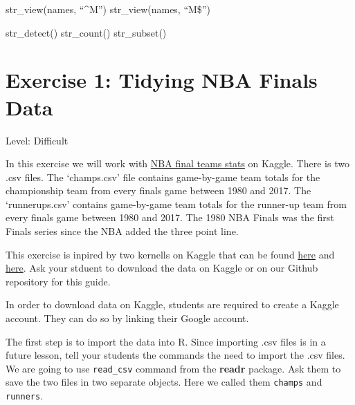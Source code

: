 \documentclass[]{book}
\newenvironment{Shaded}{\begin{snugshade}}{\end{snugshade}}
\newcommand{\CommentTok}[1]{\textcolor[rgb]{0.56,0.35,0.01}{\textit{#1}}}
\newcommand{\DataTypeTok}[1]{\textcolor[rgb]{0.13,0.29,0.53}{#1}}
\newcommand{\KeywordTok}[1]{\textcolor[rgb]{0.13,0.29,0.53}{\textbf{#1}}}
\newcommand{\NormalTok}[1]{#1}
\newcommand{\OperatorTok}[1]{\textcolor[rgb]{0.81,0.36,0.00}{\textbf{#1}}}
\newcommand{\OtherTok}[1]{\textcolor[rgb]{0.56,0.35,0.01}{#1}}
\newcommand{\StringTok}[1]{\textcolor[rgb]{0.31,0.60,0.02}{#1}}
\begin{document}
str\_view(names, ``\^{}M'')
str\_view(names, ``M\$'')

str\_detect()
str\_count()
str\_subset()

\hypertarget{exercise-1-tidying-nba-finals-data}{%
\section*{Exercise 1: Tidying NBA Finals Data}\label{exercise-1-tidying-nba-finals-data}}

Level: Difficult

In this exercise we will work with \href{https://www.kaggle.com/daverosenman/nba-finals-team-stats}{NBA final teams stats} on Kaggle. There is two .csv files. The `champs.csv' file contains game-by-game team totals for the championship team from every finals game between 1980 and 2017. The `runnerups.csv' contains game-by-game team totals for the runner-up team from every finals game between 1980 and 2017. The 1980 NBA Finals was the first Finals series since the NBA added the three point line.

This exercise is inpired by two kernells on Kaggle that can be found \href{https://www.kaggle.com/carterallen/nba-championship-data}{here} and \href{https://www.kaggle.com/daverosenman/nba-finals-three-point-stats-1980-2017}{here}. Ask your stduent to download the data on Kaggle or on our Github repository for this guide.

In order to download data on Kaggle, students are required to create a Kaggle account. They can do so by linking their Google account.

The first step is to import the data into R. Since importing .csv files is in a future lesson, tell your students the commands the need to import the .csv files. We are going to use \texttt{read\_csv} command from the \textbf{readr} package. Ask them to save the two files in two separate objects. Here we called them \texttt{champs} and \texttt{runners}.

\begin{Shaded}
\end{Shaded}
\end{document}
